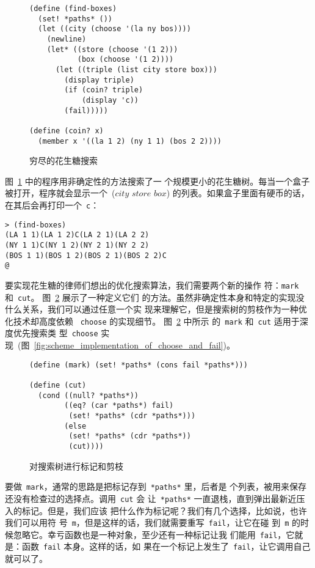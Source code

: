 \begin{figure}
\begin{lstlisting}
(define (find-boxes)
  (set! *paths* ())
  (let ((city (choose '(la ny bos))))
    (newline)
    (let* ((store (choose '(1 2)))
           (box (choose '(1 2))))
      (let ((triple (list city store box)))
        (display triple)
        (if (coin? triple)
            (display 'c))
        (fail)))))

(define (coin? x)
  (member x '((la 1 2) (ny 1 1) (bos 2 2))))
\end{lstlisting}
\caption{穷尽的花生糖搜索}
\label{fig:exhaustive_chocoblob_search}
\end{figure}

图~\ref{fig:exhaustive_chocoblob_search} 中的程序用非确定性的方法搜索了一
个规模更小的花生糖树。每当一个盒子被打开，程序就会显示一个~($city$
$store$ $box$) 的列表。如果盒子里面有硬币的话，在其后会再打印一个~\texttt{c}：
\begin{lstlisting}
> (find-boxes)
(LA 1 1)(LA 1 2)C(LA 2 1)(LA 2 2)
(NY 1 1)C(NY 1 2)(NY 2 1)(NY 2 2)
(BOS 1 1)(BOS 1 2)(BOS 2 1)(BOS 2 2)C
@
\end{lstlisting}

要实现花生糖的律师们想出的优化搜索算法，我们需要两个新的操作
符：\texttt{mark} 和~\texttt{cut}。
图~\ref{fig:marking_and_pruning_search_trees} 展示了一种定义它们
的方法。虽然非确定性本身和特定的实现没什么关系，我们可以通过任意一个实
现来理解它，但是搜索树的剪枝作为一种优化技术却高度依赖
~\texttt{choose} 的实现细节。
图~\ref{fig:marking_and_pruning_search_trees} 中所示
的~\texttt{mark} 和~\texttt{cut} 适用于深度优先搜索类
型~\texttt{choose} 实现~(图~\ref{fig:scheme_implementation_of_choose_and_fail})。

\begin{figure}
\begin{lstlisting}
(define (mark) (set! *paths* (cons fail *paths*)))

(define (cut)
  (cond ((null? *paths*))
        ((eq? (car *paths*) fail)
         (set! *paths* (cdr *paths*)))
        (else
         (set! *paths* (cdr *paths*))
         (cut))))
\end{lstlisting}
\caption{对搜索树进行标记和剪枝}
\label{fig:marking_and_pruning_search_trees}
\end{figure}

要做~\texttt{mark}，通常的思路是把标记存到~\texttt{*paths*} 里，后者是
个列表，被用来保存还没有检查过的选择点。调用~\texttt{cut} 会
让~\texttt{*paths*} 一直退栈，直到弹出最新近压入的标记。但是，我们应该
把什么作为标记呢？我们有几个选择，比如说，也许我们可以用符
号~\texttt{m}，但是这样的话，我们就需要重写~\texttt{fail}，让它在碰
到~\texttt{m} 的时候忽略它。幸亏函数也是一种对象，至少还有一种标记让我
们能用~\texttt{fail}，它就是：函数~\texttt{fail} 本身。这样的话，如
果在一个标记上发生了~\texttt{fail}，让它调用自己就可以了。

